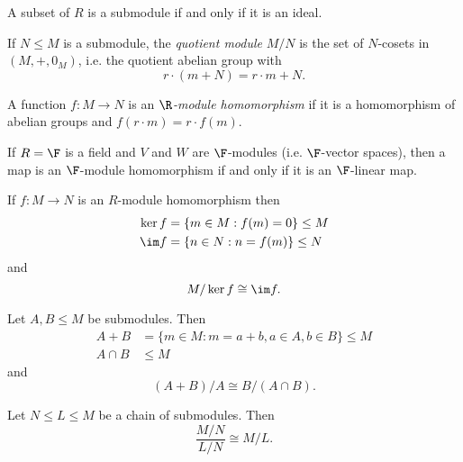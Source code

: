 \documentclass[a4paper]{article}
\begin{document}
\begin{eg}
  A subset of \(R\) is a submodule if and only if it is an ideal.
\end{eg}

\begin{definition}
  If \(N \leq M\) is a submodule, the \emph{quotient module} \(M/N\) is the set of \(N\)-cosets in \((M, +, 0_M)\), i.e. the quotient abelian group with
  \[
    r \cdot (m + N) = r \cdot m + N.
  \]
\end{definition}

\begin{definition}[Homomorphism]
  A function \(f: M \to N\) is an \emph{\(\R\)-module homomorphism} if it is a homomorphism of abelian groups and \(f(r \cdot m) = r \cdot f(m)\).
\end{definition}

\begin{eg}
  If \(R = \F\) is a field and \(V\) and \(W\) are \(\F\)-modules (i.e. \(\F\)-vector spaces), then a map is an \(\F\)-module homomorphism if and only if it is an \(\F\)-linear map.
\end{eg}

\begin{theorem}
  If \(f: M \to N\) is an \(R\)-module homomorphism then
  \begin{align*}
    \ker f &= \{m \in M: f(m) = 0\} \leq M \\
    \im f &= \{n \in N: n = f(m)\} \leq N
  \end{align*}
  and
  \[
    M/\ker f \cong \im f.
  \]
\end{theorem}

\begin{theorem}
  Let \(A, B \leq M\) be submodules. Then
  \begin{align*}
    A + B &= \{m \in M: m = a + b, a \in A, b \in B\} \leq M \\
    A \cap B &\leq M
  \end{align*}
  and
  \[
    (A + B)/A \cong B/(A \cap B).
  \]
\end{theorem}

\begin{theorem}
  Let \(N \leq L \leq M\) be a chain of submodules. Then
  \[
    \frac{M/N}{L/N} \cong M/L.
  \]
\end{theorem}
\end{document}

